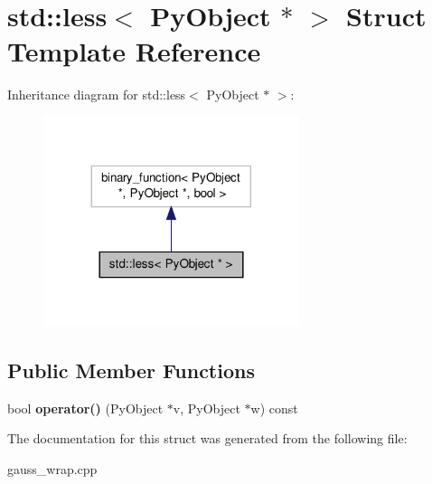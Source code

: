 \hypertarget{structstd_1_1less_3_01_py_object_01_5_01_4}{\section{std\-:\-:less$<$ Py\-Object $\ast$ $>$ Struct Template Reference}
\label{structstd_1_1less_3_01_py_object_01_5_01_4}
}


Inheritance diagram for std\-:\-:less$<$ Py\-Object $\ast$ $>$\-:\nopagebreak
\begin{figure}[H]
\begin{center}
\leavevmode
\includegraphics[width=212pt]{structstd_1_1less_3_01_py_object_01_5_01_4__inherit__graph}
\end{center}
\end{figure}
\subsection*{Public Member Functions}
\begin{DoxyCompactItemize}
\item 
\hypertarget{structstd_1_1less_3_01_py_object_01_5_01_4_ac6650a01a6547290d87f57bceade75ed}{bool {\bfseries operator()} (Py\-Object $\ast$v, Py\-Object $\ast$w) const }\label{structstd_1_1less_3_01_py_object_01_5_01_4_ac6650a01a6547290d87f57bceade75ed}

\end{DoxyCompactItemize}


The documentation for this struct was generated from the following file\-:\begin{DoxyCompactItemize}
\item 
gauss\-\_\-wrap.\-cpp\end{DoxyCompactItemize}
